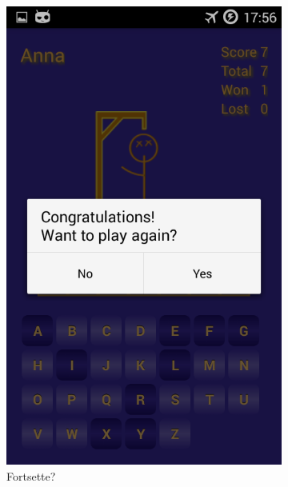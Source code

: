\begin{figure}[ht]
    \centering
    \begin{subfigure}[b]{0.3\textwidth}
        \includegraphics[width=\textwidth]{./img/bruksanvisning/5.png}
        \caption{Fortsette?}
        \label{fig:fortsette}
    \end{subfigure}
    \begin{subfigure}[b]{0.3\textwidth}

\end{subfigure}
\end{figure}
